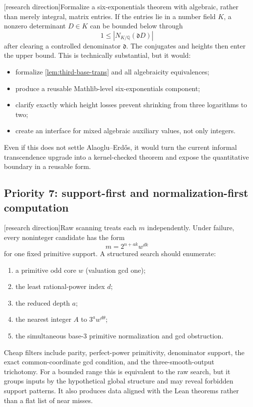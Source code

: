 \documentclass[11pt,oneside]{article}
\theoremstyle{definition}
\newcommand{\Q}{\mathbb Q}
\newcommand{\tagProposal}{\textcolor{BrickRed}{\textsf{[research direction]}}}
\begin{document}
\tagProposal Formalize a six-exponentials theorem with algebraic, rather than merely
integral, matrix entries.  If the entries lie in a number field \(K\), a nonzero determinant
\(D\in K\) can be bounded below through
\[
  1\le |N_{K/\Q}(\mathfrak dD)|
\]
after clearing a controlled denominator \(\mathfrak d\).  The conjugates and heights then
enter the upper bound.  This is technically substantial, but it would:
\begin{itemize}
\item formalize \cref{lem:third-base-trans} and all algebraicity equivalences;
\item produce a reusable Mathlib-level six-exponentials component;
\item clarify exactly which height losses prevent shrinking from three logarithms to two;
\item create an interface for mixed algebraic auxiliary values, not only integers.
\end{itemize}

Even if this does not settle Alaoglu--Erd\H{o}s, it would turn the current informal
transcendence upgrade into a kernel-checked theorem and expose the quantitative boundary in
a reusable form.

\subsection{Priority 7: support-first and normalization-first computation}

\tagProposal Raw scanning treats each \(m\) independently.  Under failure, every
noninteger candidate has the form
\[
  m=2^{n+ak}w^{dk}
\]
for one fixed primitive support.  A structured search should enumerate:
\begin{enumerate}
\item a primitive odd core \(w\) (valuation gcd one);
\item the least rational-power index \(d\);
\item the reduced depth \(a\);
\item the nearest integer \(A\) to \(3^a w^{d\theta}\);
\item the simultaneous base-3 primitive normalization and gcd obstruction.
\end{enumerate}

Cheap filters include parity, perfect-power primitivity, denominator support, the exact
common-coordinate gcd condition, and the three-smooth-output trichotomy.  For a bounded
range this is equivalent to the raw search, but it groups inputs by the hypothetical global
structure and may reveal forbidden support patterns.  It also produces data aligned with
the Lean theorems rather than a flat list of near misses.
\end{document}
